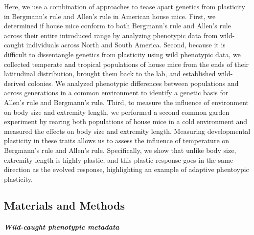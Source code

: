 \documentclass[]{article}
\let\oldsubparagraph\subparagraph
\renewcommand{\subparagraph}[1]{\oldsubparagraph{#1}\mbox{}}
\begin{document}
Here, we use a combination of approaches to tease apart genetics from
plasticity in Bergmann's rule and Allen's rule in American house mice.
First, we determined if house mice conform to both Bergmann's rule and
Allen's rule across their entire introduced range by analyzing
phenotypic data from wild-caught individuals across North and South
America. Second, because it is difficult to dissentangle genetics from
plasticity using wild phenotypic data, we collected temperate and
tropical populations of house mice from the ends of their latitudinal
distribution, brought them back to the lab, and established wild-derived
colonies. We analyzed phenotypic differences between populations and
across generations in a common environment to identify a genetic basis
for Allen's rule and Bergmann's rule. Third, to measure the influence of
environment on body size and extremity length, we performed a second
common garden experiment by rearing both populations of house mice in a
cold environment and measured the effects on body size and extremity
length. Measuring developmental plasticity in these traits allows us to
assess the influence of temperature on Bergmann's rule and Allen's rule.
Specifically, we show that unlike body size, extremity length is highly
plastic, and this plastic response goes in the same direction as the
evolved response, highlighting an example of adaptive phentoypic
plasticity.

\newpage

\hypertarget{materials-and-methods}{%
\subsection{Materials and Methods}\label{materials-and-methods}}

\hypertarget{wild-caught-phenotypic-metadata}{%
\subparagraph{\texorpdfstring{\emph{Wild-caught phenotypic
metadata}}{Wild-caught phenotypic metadata}}\label{wild-caught-phenotypic-metadata}}
\end{document}
